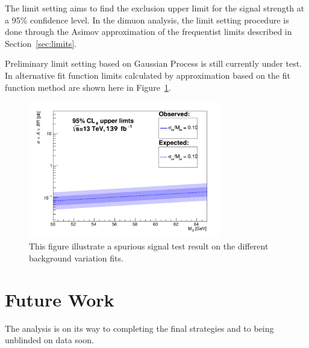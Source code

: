 The limit setting aims to find the exclusion upper limit for the signal strength at a 95\% confidence level. In the dimuon analysis, the limit setting procedure is done through the Asimov approximation of the frequentist limits described in Section~\ref{sec:limits}.

Preliminary limit setting based on Gaussian Process is still currently under test. In alternative fit function limits calculated by approximation based on the fit function method are shown here in Figure~\ref{fig:limits}.

\begin{figure}[!htb]
   \begin{center}
       \includegraphics[width=0.75\textwidth]{figures/chapter_dimuon/limits}
       \caption{
       This figure illustrate a spurious signal test result on the different background variation fits.}
        \label{fig:limits}
   \end{center}
\end{figure}
\FloatBarrier

\section{Future Work}
The analysis is on its way to completing the final strategies and to being unblinded on data soon.




